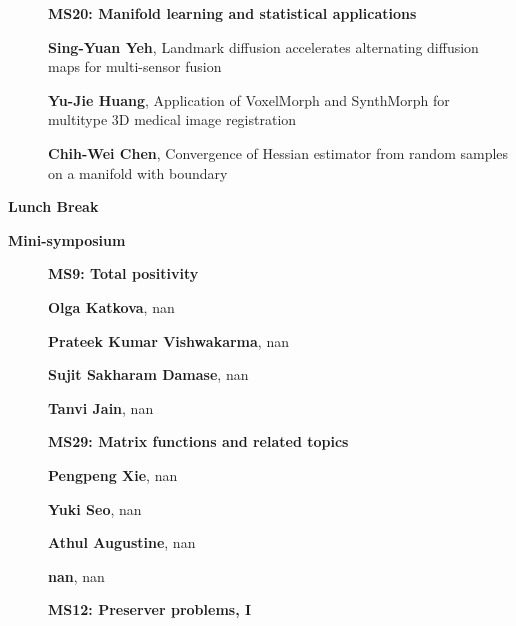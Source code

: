 \documentclass[ILAS2025-program.tex]{subfiles}
\begin{document}
\begin{description}
    \begin{description}
    \item[] {\color{mstitle}\textbf{MS20: Manifold learning and statistical applications}} 
    \item[] \textbf{Sing-Yuan Yeh}, Landmark diffusion accelerates alternating diffusion maps for multi-sensor fusion
        \item[] \textbf{Yu-Jie Huang}, Application of VoxelMorph and SynthMorph for multitype 3D medical image registration
        \item[] \textbf{Chih-Wei Chen}, Convergence of Hessian estimator from random samples on a manifold with boundary
        \end{description}
    \item[\info{12:00\textrm{--}13:30}] \textbf{Lunch Break} \info{}
    \item[\info{13:30\textrm{--}15:30}] \textbf{Mini-symposium} 
    \begin{description}
    \item[] {\color{mstitle}\textbf{MS9: Total positivity}} 
    \item[] \textbf{Olga Katkova}, nan
        \item[] \textbf{Prateek Kumar Vishwakarma}, nan
        \item[] \textbf{Sujit Sakharam Damase}, nan
        \item[] \textbf{Tanvi Jain}, nan
        \end{description}
    \begin{description}
    \item[] {\color{mstitle}\textbf{MS29: Matrix functions and related topics}} 
    \item[] \textbf{Pengpeng Xie}, nan
        \item[] \textbf{Yuki Seo}, nan
        \item[] \textbf{Athul Augustine}, nan
        \item[] \textbf{nan}, nan
        \end{description}
    \begin{description}
    \item[] {\color{mstitle}\textbf{MS12: Preserver problems, I}} 

\end{description}
\end{description}
\end{document}

